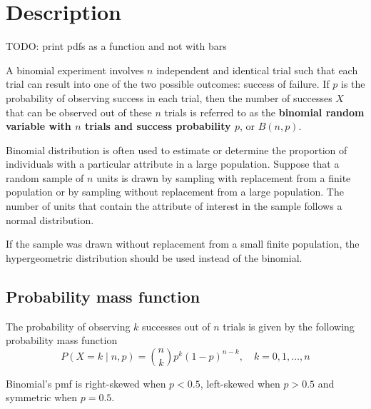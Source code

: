 \section{Description}
TODO: print pdfs as a function and not with bars


A binomial experiment involves $n$ independent and identical trial such that each trial can result into one of the two possible outcomes: success of failure. If $p$ is the probability of observing success in each trial, then the number of successes $X$ that can be observed out of these $n$ trials is referred to as the \textbf{binomial random variable with $n$ trials and success probability $p$}, or $B(n, p)$.

Binomial distribution is often used to estimate or determine the proportion of individuals with a particular attribute in a large population. Suppose that a random sample of $n$ units is drawn by sampling with replacement from a finite population or by sampling without replacement from a large population. The number of units that contain the attribute of interest in the sample follows a normal distribution.

If the sample was drawn without replacement from a small finite population, the hypergeometric distribution should be used instead of the binomial.

\subsection{Probability mass function}
The probability of observing $k$ successes out of $n$ trials is given by the following probability mass function
\[
	P(X = k \mid n, p) = \binom{n}{k}p^{k}(1 - p)^{n - k}, \quad k = 0, 1, \ldots, n
\]

Binomial's pmf is right-skewed when $p < 0.5$, left-skewed when $p > 0.5$ and symmetric when $p = 0.5$.

